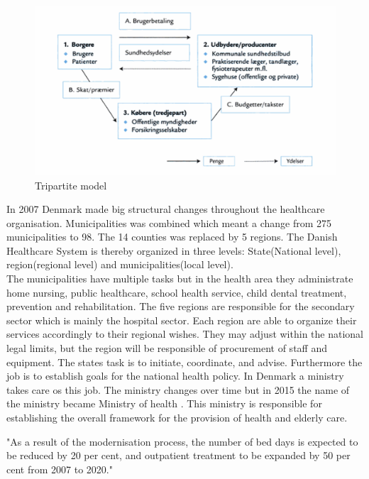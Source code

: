 \begin{figure}[H]
\centering
\includegraphics[width=1\textwidth]{Figure/tredjepart.png}
\caption{Tripartite model \cite{sundhedsvaesen}}
\label{Trepartmodel}
\end{figure} 

In 2007 Denmark made big structural changes throughout the healthcare organisation. Municipalities was combined which meant a change from 275 municipalities to 98. The 14 counties was replaced by 5 regions. The Danish Healthcare System is thereby organized in three levels: State(National level), region(regional level) and municipalities(local level)\cite{indenrigs, Healthcareindk2}.\\
The municipalities have multiple tasks but in the health area they administrate home nursing, public healthcare, school health service, child dental treatment, prevention and rehabilitation\cite{sundhedsministeriet}. 
The five regions are responsible for the secondary sector which is mainly the hospital sector. Each region are able to organize their services accordingly to their regional wishes. They may adjust within the national legal limits, but the region will be responsible of procurement of staff and equipment.
The states task is to initiate, coordinate, and advise. Furthermore the job is to establish goals for the national health policy\cite{sundhedsministeriet}. In Denmark a ministry takes care os this job. The ministry changes over time but in 2015 the name of the ministry became Ministry of health \cite{ministryofhealth}. This ministry is responsible for establishing the overall framework for the provision of health and elderly care.


"As a result of the modernisation process, the number of bed days is expected to be reduced by 20 per cent, and outpatient treatment to be expanded by 50 per cent from 2007 to 2020." \cite{Healthcareindk2}



